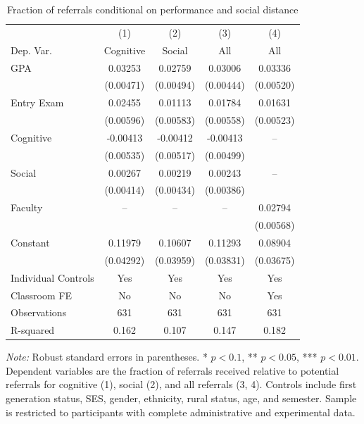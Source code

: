 \documentclass[11pt,a4paper,oneside]{article}
\begin{document}
\begin{table}
  \centering
  \begin{threeparttable}
  \caption{Fraction of referrals conditional on performance and social distance}\label{tab:regression-results1}
  \begin{tabular*}{0.85\textwidth}{@{\extracolsep{\fill}}l c c c c@{}}
  \toprule
  & (1) & (2) & (3) & (4) \\
  Dep. Var. & Cognitive & Social & All & All \\
  \midrule
  GPA & 0.03253\tnote{***} & 0.02759\tnote{***} & 0.03006\tnote{***} & 0.03336\tnote{***} \\
  & (0.00471) & (0.00494) & (0.00444) & (0.00520) \\
  Entry Exam & 0.02455\tnote{***} & 0.01113\tnote{*} & 0.01784\tnote{***} & 0.01631\tnote{***} \\
  & (0.00596) & (0.00583) & (0.00558) & (0.00523) \\
  Cognitive & -0.00413 & -0.00412 & -0.00413 & -- \\
  & (0.00535) & (0.00517) & (0.00499) &  \\
  Social & 0.00267 & 0.00219 & 0.00243 & -- \\
  & (0.00414) & (0.00434) & (0.00386) &  \\
  Faculty & -- & -- & -- & 0.02794\tnote{***} \\
  &  &  &  & (0.00568) \\
  Constant & 0.11979\tnote{***} & 0.10607\tnote{***} & 0.11293\tnote{***} & 0.08904\tnote{**} \\
  & (0.04292) & (0.03959) & (0.03831) & (0.03675) \\
  \midrule
  Individual Controls & Yes & Yes & Yes & Yes \\
  Classroom FE & No & No & No & Yes \\
  Observations & 631 & 631 & 631 & 631 \\
  R-squared & 0.162 & 0.107 & 0.147 & 0.182 \\
  \bottomrule
  \end{tabular*}
  \begin{tablenotes}[flushleft]
  \footnotesize
  \item[] \textit{Note:} Robust standard errors in parentheses. * $p < 0.1$, ** $p < 0.05$, *** $p < 0.01$. Dependent variables are the fraction of referrals received relative to potential referrals for cognitive (1), social (2), and all referrals (3, 4). Controls include first generation status, SES, gender, ethnicity, rural status, age, and semester. Sample is restricted to participants with complete administrative and experimental data.
  \end{tablenotes}
  \end{threeparttable}
  \end{table}
\end{document}

